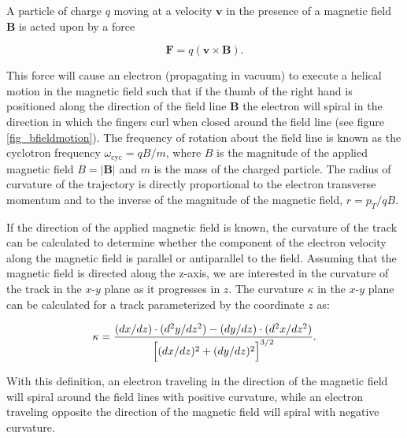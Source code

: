 \documentclass{JINST}
\begin{document}
A particle of charge $q$ moving at a velocity $\mathbf{v}$ in the presence of a magnetic field $\mathbf{B}$ is acted upon by a force

\begin{equation}\label{eqn_Bmotion}
\mathbf{F} = q(\mathbf{v} \times \mathbf{B}).
\end{equation}

This force will cause an electron (propagating in vacuum) to execute a helical motion in the magnetic field such that if the thumb of the right hand is positioned along the direction of the field line $\mathbf{B}$ the electron will spiral in the direction in which the fingers curl when closed around the field line (see figure \ref{fig_bfieldmotion}).  The frequency of rotation about the field line is known as the cyclotron frequency $\omega_{\mathrm{cyc}} = qB/m$, where $B$ is the magnitude of the applied magnetic field $B = |\mathbf{B}|$ and $m$ is the mass of the charged particle. The  radius of curvature of the trajectory is directly proportional to the electron transverse momentum and to the inverse of the magnitude of the magnetic field, $r = p_{T}/qB$.

 If the direction of the applied magnetic field is known, the curvature of the track can be calculated to determine whether the component of the electron velocity along the magnetic field is parallel or antiparallel to the field.  Assuming that the magnetic field is directed along the z-axis, we are interested in the curvature of the track in the $x$-$y$ 
plane as it progresses in $z$.  The curvature $\kappa$ in the $x$-$y$ plane can be calculated for a track
parameterized by the coordinate $z$ as:

\begin{equation}\label{eqn_curv}
\kappa = \frac{(dx/dz)\cdot(d^2y/dz^2) - (dy/dz)\cdot(d^2x/dz^2)}{\Bigl[(dx/dz)^2 + (dy/dz)^2\Bigr]^{3/2}}.
\end{equation}

With this definition, an electron traveling in the direction of the magnetic field will spiral around the field lines with positive curvature, while an electron traveling opposite the direction of the magnetic field will spiral with negative curvature.  
\end{document}
